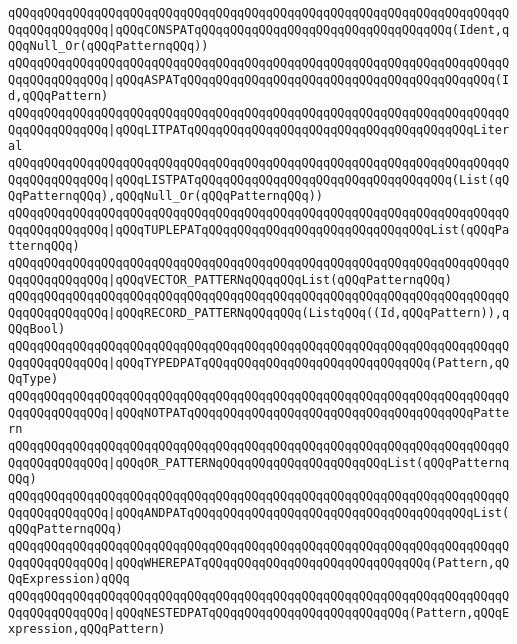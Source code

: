 \verb|qQQqqQQqqQQqqQQqqQQqqQQqqQQqqQQqqQQqqQQqqQQqqQQqqQQqqQQqqQQqqQQqqQQqqQQqqQQqqQQqqQQq|\verb#|qQQqCONSPATqQQqqQQqqQQqqQQqqQQqqQQqqQQqqQQqqQQq(Ident,qQQqNull_Or(qQQqPatternqQQq))#\newline
\verb|qQQqqQQqqQQqqQQqqQQqqQQqqQQqqQQqqQQqqQQqqQQqqQQqqQQqqQQqqQQqqQQqqQQqqQQqqQQqqQQqqQQq|\verb#|qQQqASPATqQQqqQQqqQQqqQQqqQQqqQQqqQQqqQQqqQQqqQQqqQQq(Id,qQQqPattern)#\newline
\verb|qQQqqQQqqQQqqQQqqQQqqQQqqQQqqQQqqQQqqQQqqQQqqQQqqQQqqQQqqQQqqQQqqQQqqQQqqQQqqQQqqQQq|\verb#|qQQqLITPATqQQqqQQqqQQqqQQqqQQqqQQqqQQqqQQqqQQqqQQqLiteral#\newline
\verb|qQQqqQQqqQQqqQQqqQQqqQQqqQQqqQQqqQQqqQQqqQQqqQQqqQQqqQQqqQQqqQQqqQQqqQQqqQQqqQQqqQQq|\verb#|qQQqLISTPATqQQqqQQqqQQqqQQqqQQqqQQqqQQqqQQqqQQq(List(qQQqPatternqQQq),qQQqNull_Or(qQQqPatternqQQq))#\newline
\verb|qQQqqQQqqQQqqQQqqQQqqQQqqQQqqQQqqQQqqQQqqQQqqQQqqQQqqQQqqQQqqQQqqQQqqQQqqQQqqQQqqQQq|\verb#|qQQqTUPLEPATqQQqqQQqqQQqqQQqqQQqqQQqqQQqqQQqList(qQQqPatternqQQq)#\newline
\verb|qQQqqQQqqQQqqQQqqQQqqQQqqQQqqQQqqQQqqQQqqQQqqQQqqQQqqQQqqQQqqQQqqQQqqQQqqQQqqQQqqQQq|\verb#|qQQqVECTOR_PATTERNqQQqqQQqList(qQQqPatternqQQq)#\newline
\verb|qQQqqQQqqQQqqQQqqQQqqQQqqQQqqQQqqQQqqQQqqQQqqQQqqQQqqQQqqQQqqQQqqQQqqQQqqQQqqQQqqQQq|\verb#|qQQqRECORD_PATTERNqQQqqQQq(ListqQQq((Id,qQQqPattern)),qQQqBool)#\newline
\verb|qQQqqQQqqQQqqQQqqQQqqQQqqQQqqQQqqQQqqQQqqQQqqQQqqQQqqQQqqQQqqQQqqQQqqQQqqQQqqQQqqQQq|\verb#|qQQqTYPEDPATqQQqqQQqqQQqqQQqqQQqqQQqqQQqqQQq(Pattern,qQQqType)#\newline
\verb|qQQqqQQqqQQqqQQqqQQqqQQqqQQqqQQqqQQqqQQqqQQqqQQqqQQqqQQqqQQqqQQqqQQqqQQqqQQqqQQqqQQq|\verb#|qQQqNOTPATqQQqqQQqqQQqqQQqqQQqqQQqqQQqqQQqqQQqqQQqPattern#\newline
\verb|qQQqqQQqqQQqqQQqqQQqqQQqqQQqqQQqqQQqqQQqqQQqqQQqqQQqqQQqqQQqqQQqqQQqqQQqqQQqqQQqqQQq|\verb#|qQQqOR_PATTERNqQQqqQQqqQQqqQQqqQQqqQQqList(qQQqPatternqQQq)#\newline
\verb|qQQqqQQqqQQqqQQqqQQqqQQqqQQqqQQqqQQqqQQqqQQqqQQqqQQqqQQqqQQqqQQqqQQqqQQqqQQqqQQqqQQq|\verb#|qQQqANDPATqQQqqQQqqQQqqQQqqQQqqQQqqQQqqQQqqQQqqQQqList(qQQqPatternqQQq)#\newline
\verb|qQQqqQQqqQQqqQQqqQQqqQQqqQQqqQQqqQQqqQQqqQQqqQQqqQQqqQQqqQQqqQQqqQQqqQQqqQQqqQQqqQQq|\verb#|qQQqWHEREPATqQQqqQQqqQQqqQQqqQQqqQQqqQQqqQQq(Pattern,qQQqExpression)qQQq#\newline
\verb|qQQqqQQqqQQqqQQqqQQqqQQqqQQqqQQqqQQqqQQqqQQqqQQqqQQqqQQqqQQqqQQqqQQqqQQqqQQqqQQqqQQq|\verb#|qQQqNESTEDPATqQQqqQQqqQQqqQQqqQQqqQQqqQQq(Pattern,qQQqExpression,qQQqPattern)#\newline
